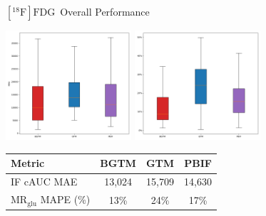 \documentclass[aspectratio=169]{beamer}
\def\mrglu{\text{MR}_{\text{glu}}}
\newcommand{\fdg}{$[^{18}\mathrm{F}]\text{FDG}$}
\begin{document}
\begin{frame}[t]{\fdg\ Overall Performance}
	\centering
	\begin{center}
		\includegraphics[width=0.35\textwidth]{fdg_curve_mae_boxplot.png}
		\includegraphics[width=0.35\textwidth]{fdg_quantification_patlak_mape_boxplot.png}
	\end{center}

	{
	\small
	\begin{tabular}{l|ccc}
		\toprule
		Metric             & BGTM   & GTM    & PBIF   \\
		\midrule
		IF cAUC MAE        & 13,024 & 15,709 & 14,630 \\
		$\mrglu$ MAPE (\%) & 13\%   & 24\%   & 17\%   \\
		\bottomrule
	\end{tabular}

	}
\end{frame}
\end{document}
